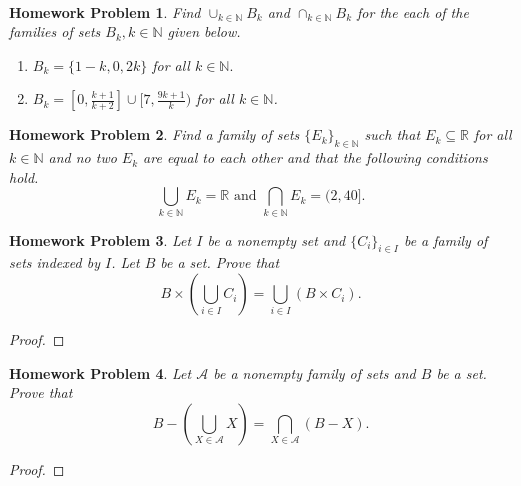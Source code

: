 \documentclass{article}
\newtheorem{hw}{Homework Problem}
\newcommand{\R}{\mathbb{R}}
\newcommand{\N}{\mathbb{N}}
\newcommand{\bp}{\begin{proof}}
\newcommand{\ep}{\end{proof}}
\newcommand{\ds}{\displaystyle}
\begin{document}
	\
	\underline{\hspace{5in}}


	\begin{hw}
		Find $\displaystyle \cup_{k\in \N} B_k$ and $\displaystyle \cap_{k \in \N} B_k$ for the each of the families of sets $B_k, k\in \N$ given below.
		\begin{enumerate}
			\item $B_k = \{ 1-k, 0, 2k \}$ for all $k \in \N.$
			\item $B_k = [0, \frac{k+1}{k+2}] \cup [7, \frac{9k+1}{k})$ for all $k \in \N$.
		\end{enumerate}
	\end{hw}
	\begin{hw}
		Find a family of sets $\{ E_k\}_{k\in \N}$ such that $E_k \subseteq \R$ for all $k \in \N$ and no two $E_k$ are equal to each other and that the following conditions hold.
		$$ \bigcup_{k \in \N} E_k = \R \textrm{  \  \  \ and \  \ \ } \ds \bigcap_{k \in \N} E_k = (2,40].$$
	\end{hw}
	\begin{hw}
		Let $I$ be a nonempty set and $\{ C_i \}_{i \in I}$ be a family of sets indexed by $I$. Let $B$ be a set. Prove that
		$$ B \times (\bigcup_{i\in I} C_i )=  \bigcup_{i \in I} (B \times C_i).$$
	\end{hw}
	\bp
	\ep

	\begin{hw}
		Let $\mathcal{A}$ be a nonempty family of sets and $B$ be a set. Prove that
		$$B- (\bigcup_{X \in \mathcal{A}} X ) = \bigcap_{X \in \mathcal{A}} (B-X).$$
	\end{hw}
	\bp
	\ep

	\underline{\hspace{5in}}

\end{document}
